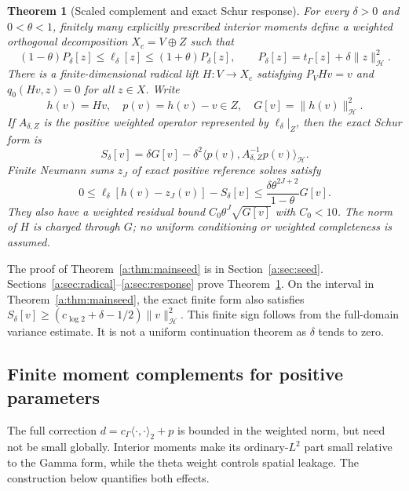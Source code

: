 \documentclass[11pt,a4paper]{article}
\numberwithin{equation}{section}
\newtheorem{theorem}{Theorem}[section]
\theoremstyle{definition}\newtheorem{definition}[theorem]{Definition}
\theoremstyle{remark}\newtheorem{remark}[theorem]{Remark}
\newcommand{\Hh}{\mathcal H}\newcommand{\Hw}{\mathcal H}
\newcommand{\tg}{t_\Gamma}\newcommand{\cg}{c_\Gamma}
\newcommand{\ip}[2]{\langle#1,#2\rangle}\newcommand{\norm}[1]{\lVert#1\rVert}\newcommand{\abs}[1]{\lvert#1\rvert}
\begin{document}
\begin{theorem}[Scaled complement and exact Schur response]\label{a:thm:mainschur}
For every $\delta>0$ and $0<\theta<1$, finitely many explicitly prescribed interior moments define a weighted orthogonal decomposition $X_c=V\oplus Z$ such that
\begin{equation}\label{a:eq:maincomparison}
 (1-\theta)P_\delta[z]\le\ell_\delta[z]
 \le(1+\theta)P_\delta[z],\qquad
 P_\delta[z]=\tg[z]+\delta\norm{z}_{\Hh}^2.
\end{equation}
There is a finite-dimensional radical lift $H:V\to X_c$ satisfying $P_VHv=v$ and $q_0(Hv,z)=0$ for all $z\in X$. Write
\[
 h(v)=Hv,\quad p(v)=h(v)-v\in Z,\quad G[v]=\norm{h(v)}_{\Hh}^2.
\]
If $A_{\delta,Z}$ is the positive weighted operator represented by $\ell_\delta|_Z$, then the exact Schur form is
\begin{equation}\label{a:eq:mainschur}
 S_\delta[v]=\delta G[v]
    -\delta^2\ip{p(v)}{A_{\delta,Z}^{-1}p(v)}_{\Hh}.
\end{equation}
Finite Neumann sums $z_J$ of exact positive reference solves satisfy
\begin{equation}\label{a:eq:mainerror}
 0\le\ell_\delta[h(v)-z_J(v)]-S_\delta[v]
 \le\frac{\delta\theta^{2J+2}}{1-\theta}G[v].
\end{equation}
They also have a weighted residual bound $C_0\theta^J\sqrt{G[v]}$ with $C_0<10$. The norm of $H$ is charged through $G$; no uniform conditioning or weighted completeness is assumed.
\end{theorem}

The proof of Theorem~\ref{a:thm:mainseed} is in Section~\ref{a:sec:seed}. Sections~\ref{a:sec:radical}--\ref{a:sec:response} prove Theorem~\ref{a:thm:mainschur}. On the interval in Theorem~\ref{a:thm:mainseed}, the exact finite form also satisfies
$S_\delta[v]\ge(c_{\log 2}+\delta-1/2)\norm v_{\Hh}^2$.
This finite sign follows from the full-domain variance estimate. It is not a uniform continuation theorem as $\delta$ tends to zero.


\subsection{Finite moment complements for positive parameters}\label{a:sec:moments}

The full correction $d=\cg\ip\cdot\cdot_2+p$ is bounded in the weighted norm, but need not be small globally. Interior moments make its ordinary-$L^2$ part small relative to the Gamma form, while the theta weight controls spatial leakage. The construction below quantifies both effects.
\end{document}
